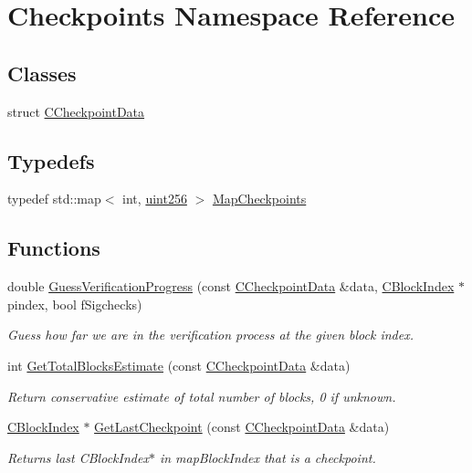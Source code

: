 \hypertarget{namespace_checkpoints}{}\section{Checkpoints Namespace Reference}
\label{namespace_checkpoints}
\subsection*{Classes}
\begin{DoxyCompactItemize}
\item 
struct \mbox{\hyperlink{struct_checkpoints_1_1_c_checkpoint_data}{C\+Checkpoint\+Data}}
\end{DoxyCompactItemize}
\subsection*{Typedefs}
\begin{DoxyCompactItemize}
\item 
typedef std\+::map$<$ int, \mbox{\hyperlink{classuint256}{uint256}} $>$ \mbox{\hyperlink{namespace_checkpoints_a996cca530c4568a2eb4516e8f351b9a2}{Map\+Checkpoints}}
\end{DoxyCompactItemize}
\subsection*{Functions}
\begin{DoxyCompactItemize}
\item 
double \mbox{\hyperlink{namespace_checkpoints_aa2e60b5114a431ccaff32a6e1f418af1}{Guess\+Verification\+Progress}} (const \mbox{\hyperlink{struct_checkpoints_1_1_c_checkpoint_data}{C\+Checkpoint\+Data}} \&data, \mbox{\hyperlink{class_c_block_index}{C\+Block\+Index}} $\ast$pindex, bool f\+Sigchecks)
\begin{DoxyCompactList}\small\item\em Guess how far we are in the verification process at the given block index. \end{DoxyCompactList}\item 
int \mbox{\hyperlink{namespace_checkpoints_a9688af1d9779e0d79a3d1d29f7a816fb}{Get\+Total\+Blocks\+Estimate}} (const \mbox{\hyperlink{struct_checkpoints_1_1_c_checkpoint_data}{C\+Checkpoint\+Data}} \&data)
\begin{DoxyCompactList}\small\item\em Return conservative estimate of total number of blocks, 0 if unknown. \end{DoxyCompactList}\item 
\mbox{\hyperlink{class_c_block_index}{C\+Block\+Index}} $\ast$ \mbox{\hyperlink{namespace_checkpoints_afe6d974f9851567cd7f0c6066e0919b5}{Get\+Last\+Checkpoint}} (const \mbox{\hyperlink{struct_checkpoints_1_1_c_checkpoint_data}{C\+Checkpoint\+Data}} \&data)
\begin{DoxyCompactList}\small\item\em Returns last C\+Block\+Index$\ast$ in map\+Block\+Index that is a checkpoint. \end{DoxyCompactList}\end{DoxyCompactItemize}
